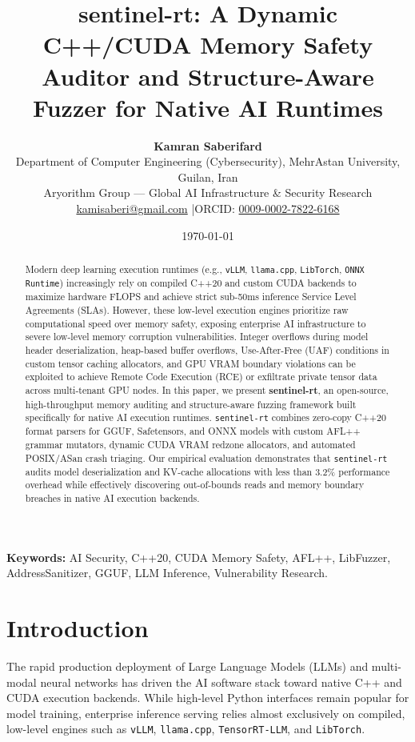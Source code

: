 \documentclass[11pt,a4paper]{article}
\title{\Large\bfseries sentinel-rt: A Dynamic C++/CUDA Memory Safety Auditor and Structure-Aware Fuzzer for Native AI Runtimes}
\author{
    \textbf{Kamran Saberifard}\\[4pt]
    Department of Computer Engineering (Cybersecurity), MehrAstan University, Guilan, Iran\\
    Aryorithm Group — Global AI Infrastructure \& Security Research\\
    \href{mailto:kamisaberi@gmail.com}{kamisaberi@gmail.com} \quad|\quad ORCID: \href{https://orcid.org/0009-0002-7822-6168}{0009-0002-7822-6168}
}
\date{\today}
\begin{document}
\maketitle

\begin{abstract}
\noindent Modern deep learning execution runtimes (e.g., \texttt{vLLM}, \texttt{llama.cpp}, \texttt{LibTorch}, \texttt{ONNX Runtime}) increasingly rely on compiled C++20 and custom CUDA backends to maximize hardware FLOPS and achieve strict sub-50ms inference Service Level Agreements (SLAs). However, these low-level execution engines prioritize raw computational speed over memory safety, exposing enterprise AI infrastructure to severe low-level memory corruption vulnerabilities. Integer overflows during model header deserialization, heap-based buffer overflows, Use-After-Free (UAF) conditions in custom tensor caching allocators, and GPU VRAM boundary violations can be exploited to achieve Remote Code Execution (RCE) or exfiltrate private tensor data across multi-tenant GPU nodes. In this paper, we present \textbf{sentinel-rt}, an open-source, high-throughput memory auditing and structure-aware fuzzing framework built specifically for native AI execution runtimes. \texttt{sentinel-rt} combines zero-copy C++20 format parsers for GGUF, Safetensors, and ONNX models with custom AFL++ grammar mutators, dynamic CUDA VRAM redzone allocators, and automated POSIX/ASan crash triaging. Our empirical evaluation demonstrates that \texttt{sentinel-rt} audits model deserialization and KV-cache allocations with less than 3.2\% performance overhead while effectively discovering out-of-bounds reads and memory boundary breaches in native AI execution backends.
\end{abstract}

\vspace{6pt}
\noindent\textbf{Keywords:} AI Security, C++20, CUDA Memory Safety, AFL++, LibFuzzer, AddressSanitizer, GGUF, LLM Inference, Vulnerability Research.

\hr

\section{Introduction}
The rapid production deployment of Large Language Models (LLMs) and multi-modal neural networks has driven the AI software stack toward native C++ and CUDA execution backends. While high-level Python interfaces remain popular for model training, enterprise inference serving relies almost exclusively on compiled, low-level engines such as \texttt{vLLM}, \texttt{llama.cpp}, \texttt{TensorRT-LLM}, and \texttt{LibTorch}.
\end{document}
